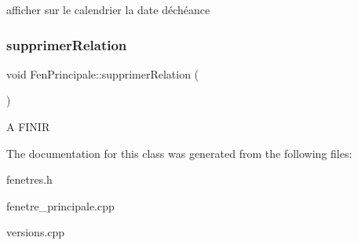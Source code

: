afficher sur le calendrier la date d\textquotesingle{}échéance \mbox{\label{class_fen_principale_a7dbafe44ea212955ba0b7d674ab5cc9d}} 
\subsubsection{\texorpdfstring{supprimer\+Relation}{supprimerRelation}}
{\footnotesize\ttfamily void Fen\+Principale\+::supprimer\+Relation (\begin{DoxyParamCaption}{ }\end{DoxyParamCaption})\hspace{0.3cm}{\ttfamily [slot]}}

A F\+I\+N\+IR 

The documentation for this class was generated from the following files\+:\begin{DoxyCompactItemize}
\item 
fenetres.\+h\item 
fenetre\+\_\+principale.\+cpp\item 
versions.\+cpp\end{DoxyCompactItemize}
